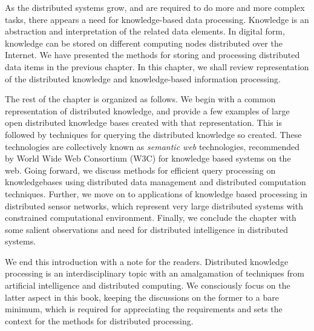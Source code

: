 
As the distributed systems grow, and are required to do more and more complex tasks, there appears a need for knowledge-based data 
processing. Knowledge is an abstraction and interpretation of the related data elements. In digital form, knowledge can be stored 
on different computing nodes distributed over the Internet. We have presented the methods for storing and processing distributed 
data items in the previous chapter. In this chapter, we shall review representation of the distributed knowledge and knowledge-based 
information processing.

 
 
The rest of the chapter is organized as follows. We begin with a common representation of distributed knowledge, and provide a 
few examples of large open distributed knowledge bases created with that representation. This is followed by techniques for 
querying the distributed knowledge so created. These technologies are collectively known as {\em semantic web} technologies, 
recommended by World Wide Web Consortium (W3C) for knowledge based systems on the web.
Going forward, we discuss methods for efficient query processing on knowledgebases using distributed data management and 
distributed computation techniques. Further, we move on to applications of knowledge based processing in distributed sensor 
networks, which represent very large distributed systems with constrained computational environment. 
Finally, we conclude the chapter with some salient observations and need for distributed intelligence in distributed systems.

We end this introduction with a note for the readers. Distributed knowledge processing is an interdisciplinary topic with an 
amalgamation of techniques from artificial intelligence and distributed computing. We consciously focus on the latter aspect
in this book, keeping the discussions on the former to a bare minimum, which is required for appreciating the requirements
and sets the context for the methods for distributed processing.







